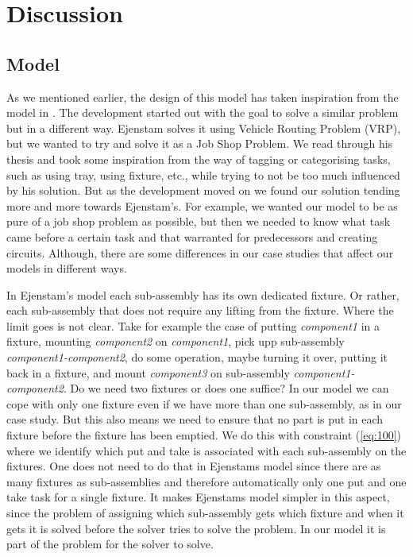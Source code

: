 \chapter{Discussion}\label{cha:discuss}

\section{Model}
As we mentioned earlier, the design of this model has taken inspiration from the model in \cite{ejenstam_2014}. The development started out with the goal to solve a similar problem but in a different way. Ejenstam solves it using Vehicle Routing Problem (VRP), but we wanted to try and solve it as a Job Shop Problem. We read through his thesis and took some inspiration from the way of tagging or categorising tasks, such as using tray, using fixture, etc., while trying to not be too much influenced by his solution. But as the development moved on we found our solution tending more and more towards Ejenstam's. For example, we wanted our model to be as pure of a job shop problem as possible, but then we needed to know what task came before a certain task and that warranted for predecessors and creating circuits. Although, there are some differences in our case studies that affect our models in different ways.

In Ejenstam's model each sub-assembly has its own dedicated fixture. Or rather, each sub-assembly that does not require any lifting from the fixture. Where the limit goes is not clear. Take for example the case of putting \emph{component1} in a fixture, mounting \emph{component2} on \emph{component1}, pick upp sub-assembly \emph{component1-component2}, do some operation, maybe turning it over, putting it back in a fixture, and mount \emph{component3} on sub-assembly \emph{component1-component2}. Do we need two fixtures or does one suffice? In our model we can cope with only one fixture even if we have more than one sub-assembly, as in our case study. But this also means we need to ensure that no part is put in each fixture before the fixture has been emptied. We do this with constraint (\ref{eq:100}) where we identify which put and take is associated with each sub-assembly on the fixtures. One does not need to do that in Ejenstams model since there are as many fixtures as sub-assemblies and therefore automatically only one put and one take task for a single fixture. It makes Ejenstams model simpler in this aspect, since the problem of assigning which sub-assembly gets which fixture and when it gets it is solved before the solver tries to solve the problem. In our model it is part of the problem for the solver to solve.


